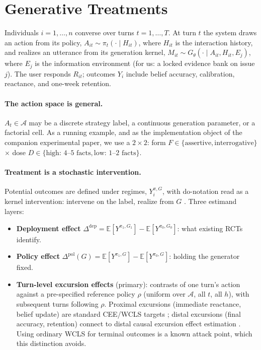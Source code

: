 \documentclass[11pt]{article}
\theoremstyle{definition}
\theoremstyle{remark}
\newcommand{\E}{\mathbb{E}}
\begin{document}
\section{Generative Treatments}\label{sec:framework}

Individuals $i = 1,\dots,n$ converse over turns $t = 1,\dots,T$. At turn $t$
the system draws an action from its policy, $A_{it} \sim \pi_t(\cdot \mid
H_{it})$, where $H_{it}$ is the interaction history, and realizes an
utterance from its generation kernel, $M_{it} \sim G_\theta(\cdot \mid
A_{it}, H_{it}, E_j)$, where $E_j$ is the information environment (for us: a
locked evidence bank on issue $j$). The user responds $R_{it}$; outcomes
$Y_i$ include belief accuracy, calibration, reactance, and one-week
retention.

\paragraph{The action space is general.} $A_t \in \mathcal{A}$ may be a
discrete strategy label, a continuous generation parameter, or a factorial
cell. As a running example, and as the implementation object of the
companion experimental paper, we use a $2\times 2$: form $F \in
\{\text{assertive}, \text{interrogative}\}$ $\times$ dose $D \in
\{\text{high: 4--5 facts}, \text{low: 1--2 facts}\}$.

\paragraph{Treatment is a stochastic intervention.} Potential outcomes are
defined under regimes, $Y_i^{\pi,G}$, with do-notation read as a kernel
intervention: intervene on the label, realize from $G$
\citep{munoz2012population,young2014identification}. Three estimand layers:
\begin{itemize}
\item \textbf{Deployment effect} $\Delta^{\mathrm{dep}} =
\E[Y^{\pi_1,G_1}] - \E[Y^{\pi_0,G_0}]$: what existing RCTs identify.
\item \textbf{Policy effect} $\Delta^{\mathrm{pol}}(G) = \E[Y^{\pi_1,G}] -
\E[Y^{\pi_0,G}]$: holding the generator fixed.
\item \textbf{Turn-level excursion effects} (primary): contrasts of one
turn's action against a pre-specified reference policy $\rho$ (uniform over
$\mathcal{A}$, all $t$, all $h$), with subsequent turns following $\rho$.
Proximal excursions (immediate reactance, belief update) are standard
CEE/WCLS targets \citep{boruvka2018assessing}; distal excursions (final
accuracy, retention) connect to distal causal excursion effect estimation
\citep{qian2025dcee}. Using ordinary WCLS for terminal outcomes is a known
attack point, which this distinction avoids.
\end{itemize}
\end{document}
